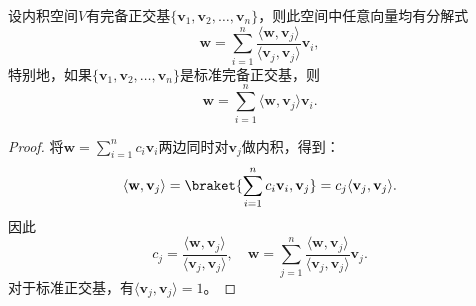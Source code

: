 \begin{theorem}\label{thm:vector_decomposition}
    设内积空间$V$有完备正交基$\{\mathbf{v}_1,\mathbf{v}_2,\dots ,\mathbf{v}_n\}$，则此空间中任意向量均有分解式
    \begin{equation}
        \mathbf{w}=\sum_{i=1}^{n}\frac{\langle \mathbf{w},\mathbf{v}_j \rangle}{\langle \mathbf{v}_j,\mathbf{v}_j \rangle}\mathbf{v}_i,
    \end{equation}
    特别地，如果$\{\mathbf{v}_1,\mathbf{v}_2,\dots ,\mathbf{v}_n\}$是标准完备正交基，则
    \begin{equation}
        \mathbf{w}=\sum_{i=1}^{n}\langle \mathbf{w},\mathbf{v}_j \rangle\mathbf{v}_i.
    \end{equation}
\end{theorem}
\begin{proof}
    将$\mathbf{w}=\sum_{i = 1}^{n} c_i \mathbf{v}_i$两边同时对$\mathbf{v}_j$做内积，得到：
    \begin{equation}
        \langle \mathbf{w},\mathbf{v}_j \rangle=\braket{\sum_{i = 1}^{n} c_i \mathbf{v}_i,\mathbf{v}_j} =c_j\langle \mathbf{v}_j,\mathbf{v}_j \rangle.
    \end{equation}
    因此
    \begin{equation}
        c_j=\frac{\langle \mathbf{w},\mathbf{v}_j \rangle}{\langle \mathbf{v}_j,\mathbf{v}_j \rangle},\quad \mathbf{w}=\sum_{j = 1}^{n} \frac{\langle \mathbf{w},\mathbf{v}_j \rangle}{\langle \mathbf{v}_j,\mathbf{v}_j \rangle} \mathbf{v}_j.
    \end{equation}
    对于标准正交基，有$\langle \mathbf{v}_j,\mathbf{v}_j \rangle=1$。
\end{proof}

